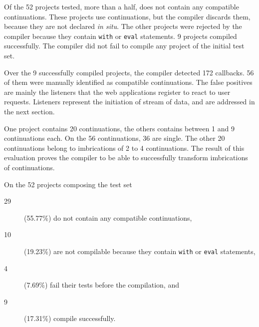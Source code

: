 
Of the \num{52} projects tested, more than a half, does not contain any compatible continuations.
These projects use continuations, but the compiler discards them, because they are not declared \textit{in situ}.
The other projects were rejected by the compiler because they contain \texttt{with} or \texttt{eval} statements. %
\num{9} projects compiled successfully.
The compiler did not fail to compile any project of the initial test set.

Over the \num{9} successfully compiled projects, the compiler detected \num{172} callbacks.
56 of them were manually identified as compatible continuations.
The false positives are mainly the listeners that the web applications register to react to user requests.
Listeners represent the initiation of stream of data, and are addressed in the next section.

One project contains \num{20} continuations, the others contains between \num{1} and \num{9} continuations each.
On the \num{56} continuations, \num{36} are single. %
The other \num{20} continuations belong to imbrications of 2 to 4 continuations.
The result of this evaluation proves the compiler to be able to successfully transform imbrications of continuations.

\begin{figure}[h!]
\end{figure}

On the \num{52} projects composing the test set
\begin{description}
\item[29] (55.77\%) do not contain any compatible continuations,
\item[10] (19.23\%) are not compilable because they contain \texttt{with} or \texttt{eval} statements,
\item[4] (7.69\%) fail their tests before the compilation, and
\item[9] (17.31\%) compile successfully.
\end{description}












